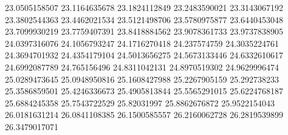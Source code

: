 \documentclass[draft=on]{scrbook}
\begin{document}
\begin{minipage}{.5\textwidth}
23.0505158507
23.1164635678
23.1824112849
23.2483590021
23.3143067192
23.3802544363
23.4462021534
23.5121498706
23.5780975877
23.6440453048
23.7099930219
23.7759407391
23.8418884562
23.9078361733
23.9737838905
24.0397316076
24.1056793247
24.1716270418
24.237574759
24.3035224761
24.3694701932
24.4354179104
24.5013656275
24.5673133446
24.6332610617
24.6992087789
24.765156496
24.8311042131
24.8970519302
24.9629996474
25.0289473645
25.0948950816
25.1608427988
25.2267905159
25.292738233
25.3586859501
25.4246336673
25.4905813844
25.5565291015
25.6224768187
25.6884245358
25.7543722529
25.82031997
25.8862676872
25.9522154043
26.0181631214
26.0841108385
26.1500585557
26.2160062728
26.2819539899
26.3479017071

\end{minipage}%
\end{document}

